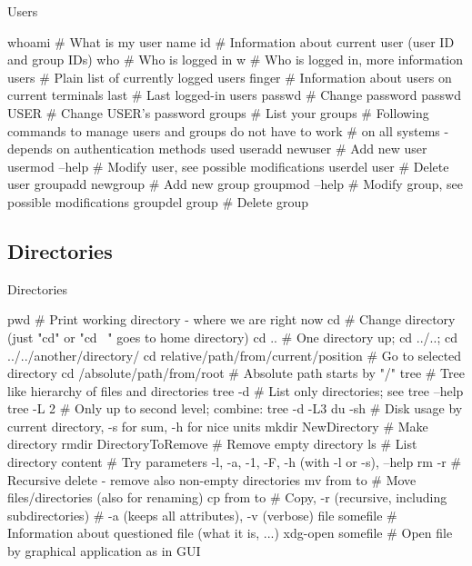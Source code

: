\documentclass[compress, ucs, xelatex, 11pt, xcolor=svgnames,
  hyperref={
    bookmarks=true,
    unicode=true,
    colorlinks=true,
    pdftitle={Linux, command line and MetaCentrum},
    plainpages=false,
    pdfauthor={Vojtech Zeisek},
    pdfsubject={Course about use of Linux command line, writing shell scripts and using MetaCentrum of CESNET},
    pdfcreator={XeLaTeX},
    pdfkeywords={Linux, GNU, BASH, shell, command line, MetaCentrum},
    linkcolor=DarkRed,
    anchorcolor=DarkBlue,
    citecolor=Indigo,
    filecolor=NavyBlue,
    menucolor=DarkMagenta,
    urlcolor=DarkBlue,
    pdftex},
  url={hyphens, lowtilde} %
  ]{beamer}
\begin{document}
\begin{frame}[fragile]{Users}
  \begin{bashcode}
    whoami # What is my user name
    id # Information about current user (user ID and group IDs)
    who # Who is logged in
    w # Who is logged in, more information
    users # Plain list of currently logged users
    finger # Information about users on current terminals
    last # Last logged-in users
    passwd # Change password
    passwd USER # Change USER's password
    groups # List your groups
    # Following commands to manage users and groups do not have to work
    # on all systems - depends on authentication methods used
    useradd newuser # Add new user
    usermod --help # Modify user, see possible modifications
    userdel user # Delete user
    groupadd newgroup # Add new group
    groupmod --help # Modify group, see possible modifications
    groupdel group # Delete group
  \end{bashcode}
\end{frame}

\subsection{Directories}

\begin{frame}[fragile]{Directories}
  \begin{bashcode}
    pwd # Print working directory - where we are right now
    cd # Change directory (just "cd" or "cd ~" goes to home directory)
    cd .. # One directory up; cd ../..; cd ../../another/directory/
    cd relative/path/from/current/position # Go to selected directory
    cd /absolute/path/from/root # Absolute path starts by "/"
    tree # Tree like hierarchy of files and directories
    tree -d # List only directories; see tree --help
    tree -L 2 # Only up to second level; combine: tree -d -L3
    du -sh # Disk usage by current directory, -s for sum, -h for nice units
    mkdir NewDirectory # Make directory
    rmdir DirectoryToRemove # Remove empty directory
    ls # List directory content
       # Try parameters -l, -a, -1, -F, -h (with -l or -s), --help
    rm -r # Recursive delete - remove also non-empty directories
    mv from to # Move files/directories (also for renaming)
    cp from to # Copy, -r (recursive, including subdirectories)
               # -a (keeps all attributes), -v (verbose)
    file somefile # Information about questioned file (what it is, ...)
    xdg-open somefile # Open file by graphical application as in GUI
  \end{bashcode}
\end{frame}
\end{document}
